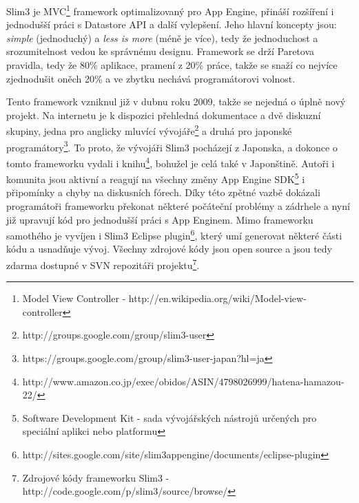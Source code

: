 Slim3 je MVC\footnote{Model View Controller - http://en.wikipedia.org/wiki/Model-view-controller}
framework optimalizovaný pro App Engine, přináší rozšíření i jednodušší práci s Datastore API a další vylepšení. Jeho hlavní koncepty jsou: \emph{simple} (jednoduchý) a \emph{less is more} (méně je více), tedy že jednoduchost a srozumitelnost vedou ke správnému designu. Framework se drží Paretova pravidla, tedy že 80\% aplikace, pramení z 20\% práce, takže se snaží co nejvíce zjednodušit oněch 20\% a ve zbytku nechává programátorovi volnost.

Tento framework vzniknul již v dubnu roku 2009, takže se nejedná o úplně nový projekt. Na internetu je k dispozici přehledná dokumentace a dvě diskuzní skupiny, jedna pro anglicky mluvící vývojáře\footnote{http://groups.google.com/group/slim3-user} a druhá pro japonské programátory\footnote{https://groups.google.com/group/slim3-user-japan?hl=ja}. To proto, že vývojáři Slim3 pocházejí z Japonska, a dokonce o tomto frameworku vydali i knihu\footnote{http://www.amazon.co.jp/exec/obidos/ASIN/4798026999/hatena-hamazou-22/}, bohužel je celá také v Japonštině. Autoři i komunita jsou aktivní a reagují na všechny změny App Engine SDK\footnote{Software Development Kit - sada vývojářských nástrojů určených pro speciální aplikci nebo platformu} i připomínky a chyby na diskusních fórech. Díky této zpětné vazbě dokázali programátoři frameworku překonat některé počáteční problémy a zádrhele a nyní již upravují kód pro jednodušší práci s App Enginem. Mimo frameworku samothého je vyvíjen i Slim3 Eclipse plugin\footnote{http://sites.google.com/site/slim3appengine/documents/eclipse-plugin}, který umí generovat některé části kódu a usnadňuje vývoj. Všechny zdrojové kódy jsou open source a jsou tedy zdarma dostupné v SVN repozitáři projektu\footnote{Zdrojové kódy frameworku Slim3 -http://code.google.com/p/slim3/source/browse/}.

